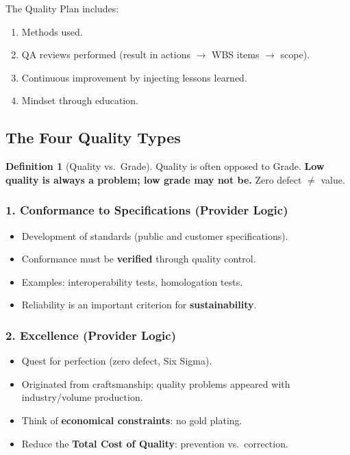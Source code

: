 \documentclass[11pt,a4paper]{article}
\theoremstyle{definition}
\newtheorem{definition}{Definition}[section]
\theoremstyle{plain}
\begin{document}
The Quality Plan includes:
\begin{enumerate}[nosep, label=\arabic*.]
  \item Methods used.
  \item QA reviews performed (result in actions $\to$ WBS items $\to$ scope).
  \item Continuous improvement by injecting lessons learned.
  \item Mindset through education.
\end{enumerate}

\subsection{The Four Quality Types}

\begin{definition}[Quality vs.\ Grade]
Quality is often opposed to Grade. \textbf{Low quality is always a problem; low grade may not be.} Zero defect $\neq$ value.
\end{definition}

\subsubsection{1. Conformance to Specifications (Provider Logic)}

\begin{itemize}[nosep]
  \item Development of standards (public and customer specifications).
  \item Conformance must be \textbf{verified} through quality control.
  \item Examples: interoperability tests, homologation tests.
  \item Reliability is an important criterion for \textbf{sustainability}.
\end{itemize}

\subsubsection{2. Excellence (Provider Logic)}

\begin{itemize}[nosep]
  \item Quest for perfection (zero defect, Six Sigma).
  \item Originated from craftsmanship; quality problems appeared with industry/volume production.
  \item Think of \textbf{economical constraints}: no gold plating.
  \item Reduce the \textbf{Total Cost of Quality}: prevention vs.\ correction.
\end{itemize}
\end{document}
